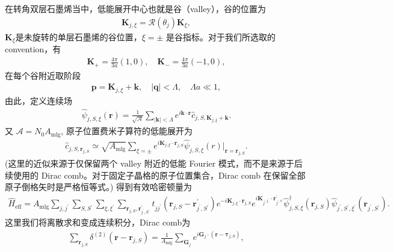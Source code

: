 \documentclass[10pt, oneside]{article}
\begin{document}
在转角双层石墨烯当中，低能展开中心也就是谷（valley），谷的位置为
\begin{align}
	\bm{K}_{j,\xi} = \mathcal{R}\left(\theta_{j}\right) \bm{K}_{\xi},
\end{align}
\(\bm{K}_{\xi}\)是未旋转的单层石墨烯的谷位置，\(\xi = \pm\) 是谷指标。对于我们所选取的convention，有
\begin{align}
	\bm{K}_{+} = \frac{4 \pi}{3 a} \left(1, 0\right), \quad \bm{K}_{-} = \frac{4 \pi}{3 a} \left(-1, 0\right),
\end{align}
在每个谷附近取阶段
\begin{align}
	\bm{p} = \bm{K}_{j, \xi} + \bm{k}, \quad \left|\bm{q}\right| < \Lambda, \quad \Lambda a \ll 1,
\end{align}
由此，定义连续场
\begin{align}
	\boxed{
		\hat{\psi}_{j,S,\xi} \left(\bm{r}\right) = \frac{1}{\sqrt{\mathcal{A}}} \sum_{\left|\bm{k}\right| < \Lambda} e^{i \bm{k} \cdot \bm{r}} \hat{c}_{j,S, \bm{K}_{j, \xi} + \bm{k}}.
	}
\end{align}
又 \(\mathcal{A} = N_{0} A_{\mathrm{mlg}}\), 原子位置费米子算符的低能展开为
\begin{align}
	\boxed{
		\hat{c}_{j,S, \bm{r}_{j,S}} \simeq \sqrt{A_{\mathrm{mlg}}} \sum_{\xi = \pm} e^{i \bm{K}_{j, \xi} \cdot \bm{r}_{j,S}} \hat{\psi}_{j,S, \xi} \left(r\right) \bigg|_{\bm{r} = \bm{r}_{j,S}}.
	}
\end{align}
(这里的近似来源于仅保留两个 valley 附近的低能 Fourier 模式，而不是来源于后续使用的 Dirac comb。对于固定子晶格的原子位置集合，Dirac comb 在保留全部原子倒格矢时是严格恒等式。) 得到有效哈密顿量为
\begin{align}
	\hat{H}_{\mathrm{eff}} = A_{\mathrm{mlg}} \sum_{j,j^{\prime}} \sum_{S,S^{\prime}} \sum_{\xi,\xi^{\prime}} \sum_{\bm{r}_{j,S}, \bm{r}^{\prime}_{j^{\prime}, S^{\prime}}} t_{j j^{\prime}} \left(\bm{r}_{j,S} - \bm{r}^{\prime}_{j^{\prime}, S^{\prime}}\right) e^{-i \bm{K}_{j, \xi} \cdot \bm{r}_{j,S}} e^{i \bm{K}_{j^{\prime, \xi^{\prime}}} \cdot \bm{r}^{\prime}_{j^{\prime, S^{\prime}}} } \hat{\psi}^{\dagger}_{j, S, \xi} \left(\bm{r}_{j,S}\right)  \hat{\psi}_{j^{\prime}, S^{\prime}, \xi^{\prime}} \left(\bm{r}_{j^{\prime}, S^{\prime}}\right).
\end{align}
这里我们将离散求和变成连续积分，Dirac comb为
\begin{align}
	\boxed{
		\sum_{\bm{r}_{j,S}} \delta^{\left(2\right)} \left(\bm{r} - \bm{r}_{j,S}\right) = \frac{1}{A_{\mathrm{mlg}}} \sum_{\bm{G}_{j}}e^{i \bm{G}_{j} \cdot \left(\bm{r} - \bm{\tau}_{j,S}\right)},
	}
\end{align}
\end{document}
